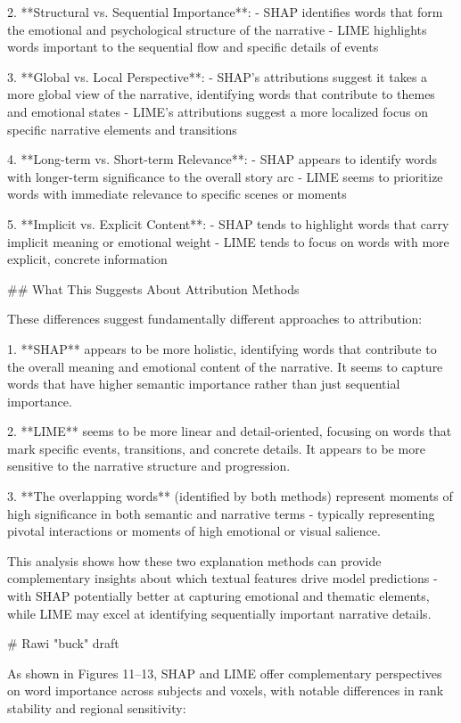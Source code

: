 2. **Structural vs. Sequential Importance**:
   - SHAP identifies words that form the emotional and psychological structure of the narrative
   - LIME highlights words important to the sequential flow and specific details of events

3. **Global vs. Local Perspective**:
   - SHAP's attributions suggest it takes a more global view of the narrative, identifying words that contribute to themes and emotional states
   - LIME's attributions suggest a more localized focus on specific narrative elements and transitions

4. **Long-term vs. Short-term Relevance**:
   - SHAP appears to identify words with longer-term significance to the overall story arc
   - LIME seems to prioritize words with immediate relevance to specific scenes or moments

5. **Implicit vs. Explicit Content**:
   - SHAP tends to highlight words that carry implicit meaning or emotional weight
   - LIME tends to focus on words with more explicit, concrete information

## What This Suggests About Attribution Methods

These differences suggest fundamentally different approaches to attribution:

1. **SHAP** appears to be more holistic, identifying words that contribute to the overall meaning and emotional content of the narrative. It seems to capture words that have higher semantic importance rather than just sequential importance.

2. **LIME** seems to be more linear and detail-oriented, focusing on words that mark specific events, transitions, and concrete details. It appears to be more sensitive to the narrative structure and progression.

3. **The overlapping words** (identified by both methods) represent moments of high significance in both semantic and narrative terms - typically representing pivotal interactions or moments of high emotional or visual salience.

This analysis shows how these two explanation methods can provide complementary insights about which textual features drive model predictions - with SHAP potentially better at capturing emotional and thematic elements, while LIME may excel at identifying sequentially important narrative details.




# Rawi "buck" draft


As shown in Figures 11--13, SHAP and LIME offer complementary perspectives on word importance across subjects and voxels, with notable differences in rank stability and regional sensitivity:

